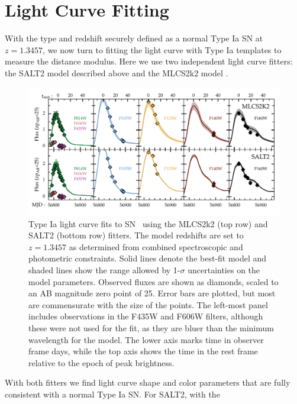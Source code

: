 \section{Light Curve Fitting}
\label{sec:LightCurveFitting}

With the type and redshift securely defined as a normal
Type Ia SN at $z=1.3457$, we now turn to fitting the light curve with
Type Ia templates to measure the distance modulus.  Here we use two
independent light curve fitters: the SALT2 model described
above and the MLCS2k2 model \citep{Jha:2007}.   


\begin{figure}
\begin{center}
\includegraphics[width=\textwidth]{FIG/snTomas_lightcurve_fit_fluxAB25}
\caption{ Type Ia light curve fits to SN \tomas\ using the MLCS2k2
(top row) and SALT2 (bottom row) fitters. The model redshifts are set to
$z=1.3457$ as determined from combined
spectroscopic and photometric constraints.  Solid lines denote the
best-fit model and shaded lines show the range allowed by 1-$\sigma$
uncertainties on the model parameters. 
Observed fluxes are shown as diamonds, scaled to an AB magnitude
zero point of 25. Error bars are plotted, but most are commensurate
with the size of the points. The left-most panel includes observations
in the F435W and F606W filters, although these were not used for the
fit, as they are bluer than the minimum wavelength for the model. The
lower axis marks time in observer frame days, while the top axis shows
the time in the rest frame relative to the epoch of peak brightness.
\label{fig:LightCurveFits} }
\end{center}
\end{figure}

With both fitters we find light curve shape and color parameters that
are fully consistent with a normal Type Ia SN.  For SALT2, with the


